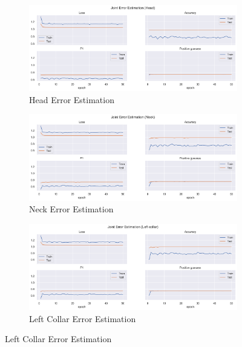 \begin{figure}[!ht]
  \centering
  \begin{subfigure}[b]{0.47\linewidth}
      \centering
      \includegraphics[width=\textwidth]{figures/Results/v1/jt/Head_ErrorEstimation.png}
      \caption{Head Error Estimation}
      \label{fig:v1_head_jt_ee}
  \end{subfigure}
  \hfill
  \begin{subfigure}[b]{0.47\linewidth}
      \centering
      \includegraphics[width=\textwidth]{figures/Results/v1/jt/Neck_ErrorEstimation.png}
      \caption{Neck Error Estimation}
      \label{fig:v1_neck_jt_ee}
  \end{subfigure}
  \hfill
  \begin{subfigure}[b]{0.47\linewidth}
      \centering
      \includegraphics[width=\textwidth]{figures/Results/v1/jt/Left collar_ErrorEstimation.png}
      \caption{Left Collar Error Estimation}

\end{subfigure}
\end{figure}
